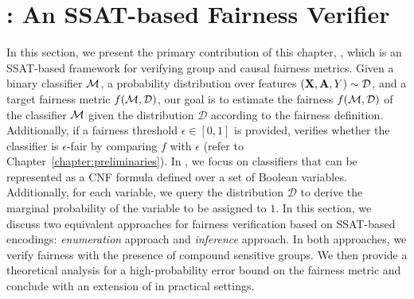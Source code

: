 \section{{\justicia}: An SSAT-based Fairness Verifier}
\label{fairness_justicia_sec:framework}
In this section, we present the primary contribution of this chapter, {\justicia}, which is an SSAT-based framework for verifying group and causal fairness metrics. Given a binary classifier $\alg$, a probability distribution over features $(\mathbf{X},\mathbf{A},Y) \sim \mathcal{D} $, and a target fairness metric $ f(\mathcal{M}, \mathcal{D}) $, our goal is to estimate the fairness $ f(\mathcal{M}, \mathcal{D}) $ of the classifier $ \alg $ given the distribution $ \mathcal{D} $ according to the fairness definition. Additionally, if a fairness threshold $ \epsilon \in [0,1] $ is provided, {\justicia} verifies whether the classifier is $ \epsilon $-fair by comparing $ f $ with $ \epsilon $ (refer to Chapter~\ref{chapter:preliminaries}). In {\justicia}, we focus on classifiers that can be represented as a CNF formula defined over a set of Boolean variables. Additionally, for each variable, we query the distribution $ \mathcal{D} $ to derive the marginal probability of the variable to be assigned to $ 1 $. In this section, we discuss two equivalent approaches for fairness verification based on SSAT-based encodings: \emph{enumeration} approach and \emph{inference} approach. In both approaches, we verify fairness with the presence of compound sensitive groups.  We then provide a theoretical analysis for a high-probability error bound on the fairness metric and conclude with an extension of {\justicia} in practical settings.




\iffalse
In this section, we present the main contribution of this paper, {\justicia}, which is an SSAT framework for verifying independence and separation metrics of fairness. 
We first state the problem formally in Section~\ref{fairness_justicia_sec:problem_statement}. 
To verify fairness metrics in compound sensitive groups, we discuss an enumeration approach in Section~\ref{fairness_justicia_sec:enumeration_ssat} and an equivalent but more efficient learning approach in Section~\ref{fairness_justicia_sec:learn_ssat}. 
We conclude this section by proposing a conditional distribution based enumeration for compound sensitive groups in Section~\ref{fairness_justicia_sec:cond_ssat}. 


\subsection{Problem Statement}
\label{fairness_justicia_sec:problem_statement}
Given a binary classifier $\alg$ and a probability distribution over dataset $(X,A,Y) \sim \mathcal{D} $, our goal is to verify whether $\alg$ achieves independence and separation metrics with respect to the distribution $\mathcal{D}$. We  focus on a classifier that can be translated to a CNF formula of Boolean variables $\mathbf{B} $. 
The probability $ p_i $ of $\bool_i \in \mathbf{B}$ being assigned to $1$ is induced by the data generating distribution $\mathcal{D}$. 
In our contribution, we reduce the verification problem to solving appropriately designed SSAT instances.
\fi 

